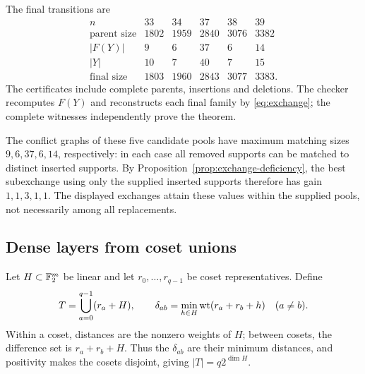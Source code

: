 The final transitions are
\[
\begin{array}{c|rrrrr}
n&33&34&37&38&39\\\hline
\text{parent size}&1802&1959&2840&3076&3382\\
|F(Y)|&9&6&37&6&14\\
|Y|&10&7&40&7&15\\
\text{final size}&1803&1960&2843&3077&3383.
\end{array}
\]
The certificates include complete parents, insertions and deletions.
The checker recomputes $F(Y)$ and reconstructs each final family by
\eqref{eq:exchange}; the complete witnesses independently prove the theorem.

The conflict graphs of these five candidate pools have maximum matching
sizes $9,6,37,6,14$, respectively: in each case all removed supports
can be matched to distinct inserted supports. By
Proposition~\ref{prop:exchange-deficiency}, the best subexchange using
only the supplied inserted supports therefore has gain $1,1,3,1,1$.
The displayed exchanges attain these values within the supplied pools,
not necessarily among all replacements.

\subsection{Dense layers from coset unions}
Let $H\subset\mathbb F_2^m$ be linear and let $r_0,\ldots,r_{q-1}$ be coset
representatives. Define
\begin{equation}\label{eq:coset-union}
 T=\bigcup_{a=0}^{q-1}(r_a+H),\qquad
 \delta_{ab}=\min_{h\in H}\operatorname{wt}(r_a+r_b+h)\quad(a\ne b).
\end{equation}
Within a coset, distances are the nonzero weights of $H$; between
cosets, the difference set is $r_a+r_b+H$. Thus the $\delta_{ab}$
are their minimum distances, and positivity makes the cosets disjoint,
giving $|T|=q2^{\dim H}$.

